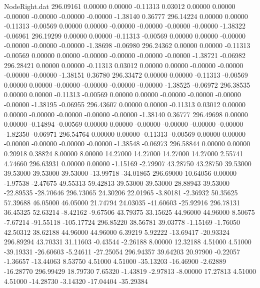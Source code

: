 \begin{filecontents}{NodeRight.dat}
 296.09161    0.00000    0.00000    -0.11313    0.03012    0.00000    0.00000   -0.00000   -0.00000   -0.00000   -0.00000   -1.38140    0.36777
 296.14224    0.00000    0.00000    -0.11313   -0.00569    0.00000    0.00000   -0.00000   -0.00000   -0.00000   -0.00000   -1.38322   -0.06961
 296.19299    0.00000    0.00000    -0.11313   -0.00569    0.00000    0.00000   -0.00000   -0.00000   -0.00000   -0.00000   -1.38698   -0.06980
 296.24362    0.00000    0.00000    -0.11313   -0.00569    0.00000    0.00000   -0.00000   -0.00000   -0.00000   -0.00000   -1.38721   -0.06982
 296.28421    0.00000    0.00000    -0.11313    0.03012    0.00000    0.00000   -0.00000   -0.00000   -0.00000   -0.00000   -1.38151    0.36780
 296.33472    0.00000    0.00000    -0.11313   -0.00569    0.00000    0.00000   -0.00000   -0.00000   -0.00000   -0.00000   -1.38525   -0.06972
 296.38535    0.00000    0.00000    -0.11313   -0.00569    0.00000    0.00000   -0.00000   -0.00000   -0.00000   -0.00000   -1.38195   -0.06955
 296.43607    0.00000    0.00000    -0.11313    0.03012    0.00000    0.00000   -0.00000   -0.00000   -0.00000   -0.00000   -1.38140    0.36777
 296.49698    0.00000    0.00000    -0.14894   -0.00569    0.00000    0.00000   -0.00000   -0.00000   -0.00000   -0.00000   -1.82350   -0.06971
 296.54764    0.00000    0.00000    -0.11313   -0.00569    0.00000    0.00000   -0.00000   -0.00000   -0.00000   -0.00000   -1.38548   -0.06973
 296.58844    0.00000    0.00000     0.20918    0.38824    8.00000    8.00000   14.27000   14.27000   14.27000   14.27000    2.55741    4.74660
 296.63931    0.00000    0.00000    -1.15169   -2.79907   43.28750   43.28750   39.53000   39.53000   39.53000   39.53000  -13.99718  -34.01865
 296.69000   10.64056    0.00000    -1.97538   -2.47675   49.55313   59.42813   39.53000   39.53000   28.88943   39.53000  -22.89535  -28.70646
 296.73065   24.30206   22.01965    -3.80181   -2.36932   50.35625   57.39688   46.05000   46.05000   21.74794   24.03035  -41.60603  -25.92916
 296.78131   36.45325   52.63214    -8.42162   -9.67506   43.79375   33.15625   44.96000   44.96000    8.50675   -7.67214  -91.55118 -105.17724
 296.85220   38.56781   39.03778    -1.15169   -1.76050   42.50312   38.62188   44.96000   44.96000    6.39219    5.92222  -13.69417  -20.93324
 296.89294   43.70331   31.11603    -0.43544   -2.26188    8.00000   12.32188    4.51000    4.51000  -39.19331  -26.60603   -5.24611  -27.25054
 296.94357   39.64203   20.97900    -0.22057   -1.36657  -13.44063    8.53750    4.51000    4.51000  -35.13203  -16.46900   -2.62889  -16.28770
 296.99429   18.79730    7.65320    -1.43819   -2.97813   -8.00000   17.27813    4.51000    4.51000  -14.28730   -3.14320  -17.04404  -35.29384

\end{filecontents}
